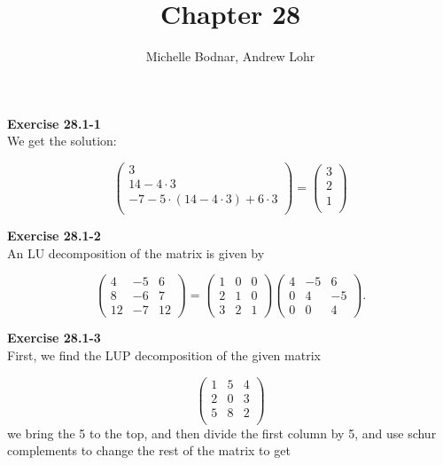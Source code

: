 \documentclass{article}
\title{Chapter 28}
\author{Michelle Bodnar, Andrew Lohr}
\begin{document}
\maketitle
\noindent\textbf{Exercise 28.1-1}\\

We get the solution:

\[
\left(
\begin{array}{c}
3\\
14 - 4\cdot3\\
-7 -5 \cdot( 14 - 4 \cdot 3) + 6\cdot 3\\
\end{array}\right) = \left(
\begin{array}{c}
3\\
2\\
1 \\
\end{array}\right)
\]

\noindent\textbf{Exercise 28.1-2}\\

An LU decomposition of the matrix is given by 

\[ \left(\begin{array}{ccc} 4 & -5 & 6 \\ 8 & -6 & 7 \\ 12 & -7 & 12 \end{array} \right) =  \left(\begin{array}{ccc} 1 & 0 & 0 \\ 2 & 1 & 0 \\ 3 & 2 & 1 \end{array} \right) \left(\begin{array}{ccc} 4 & -5 & 6 \\ 0 & 4 & -5 \\ 0 & 0 & 4 \end{array} \right).\]

\noindent\textbf{Exercise 28.1-3}\\

First, we find the LUP decomposition of the given matrix

\[
\left(\begin{array}{ccc}
1&5&4\\
2&0&3\\
5&8&2\\
\end{array} \right)
\]
 we bring the 5 to the top, and then divide the first column by 5, and use schur complements to change the rest of the matrix to get
 
\end{document}
